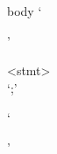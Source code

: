 \documentclass[convert={outext=.png}]{standalone}
\begin{document}
\begin{málrit}{body}
	`{'
	\begin{repnull}
		<stmt>\\
		 `;'
	\end{repnull}
	`}'
\end{málrit}
\end{document}
